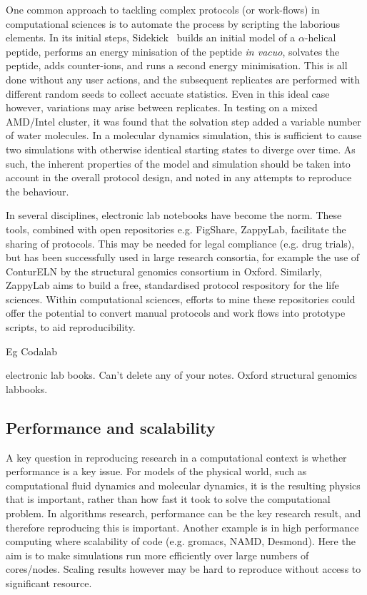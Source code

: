 \documentclass[conference]{IEEEtran}
\begin{document}
One common approach to tackling complex protocols (or work-flows) 
in computational sciences is to automate the process by scripting
the laborious elements. In its initial steps, Sidekick~\cite{Hall2014Sidekick}
builds an initial model of a $\alpha$-helical peptide, performs an
energy minisation of the peptide \emph{in vacuo}, solvates the peptide,
adds counter-ions, and runs a second energy minimisation. This is all
done without any user actions, and the subsequent replicates are performed
with different random seeds to collect accuate statistics. Even in this 
ideal case however, variations may arise between replicates. In testing 
on a mixed AMD/Intel cluster, it was found that the solvation step added
a variable number of water molecules. In a molecular dynamics simulation, 
this is sufficient to cause two simulations with otherwise identical 
starting states to diverge over time. As such, the inherent properties
of the model and simulation should be taken into account in the overall
protocol design, and noted in any attempts to reproduce the behaviour.

In several disciplines, electronic lab notebooks have become the norm. These
tools, combined with open repositories e.g. FigShare, ZappyLab, facilitate
the sharing of protocols. This may be needed for legal compliance (e.g. drug
trials), but has been successfully used in large research consortia, for example
the use of ConturELN by the structural genomics consortium in Oxford. Similarly, ZappyLab aims to build a free, standardised protocol respository for the life
sciences. Within computational sciences, efforts to mine these repositories 
could offer the potential to convert manual protocols and work flows into 
prototype scripts, to aid reproducibility.

Eg Codalab


electronic lab books. Can't delete any of your notes. Oxford structural genomics labbooks. 

\subsection{Performance and scalability}


A key question in reproducing research in a computational context is 
whether performance is a key issue. For models of the physical world, 
such as computational fluid dynamics and molecular dynamics, it is the 
resulting physics that is important, rather than how fast it took to 
solve the computational problem. In algorithms research, performance can be
the key research result, and therefore reproducing this is important. Another 
example is in high performance computing where scalability of code (e.g. gromacs,
NAMD, Desmond). Here the aim is to make simulations run more efficiently
over large numbers of cores/nodes. Scaling results however may be 
hard to reproduce without access to significant resource.
\end{document}

